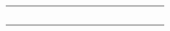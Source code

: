 \begin{landscape}
\begin{table}[]
{\begin{tabular}{@{}ccccllllllllllll@{}}
    \multicolumn{1}{l}{}                        & \multicolumn{1}{l}{}         & \multicolumn{1}{l}{}          & \multicolumn{1}{l}{}                            &                                          &                                            &                                   &                                  &                                               &                                                 &                         &          &                              &                         &          &                              \\
    \multicolumn{1}{l}{}                        & \multicolumn{1}{l}{}         & \multicolumn{1}{l}{}          & \multicolumn{1}{l}{}                            &                                          &                                            &                                   &                                  &                                               &                                                 &                         &          &                              &                         &          &                              \\
    \multicolumn{1}{l}{}                        & \multicolumn{1}{l}{}         & \multicolumn{1}{l}{}          & \multicolumn{1}{l}{}                            &                                          &                                            &                                   &                                  &                                               &                                                 &                         &          &                              &                         &          &                              \\
    \multicolumn{1}{l}{}                        & \multicolumn{1}{l}{}         & \multicolumn{1}{l}{}          & \multicolumn{1}{l}{}                            &                                          &                                            &                                   &                                  &                                               &                                                 &                         &          &                              &                         &          &                              \\
    \multicolumn{1}{l}{}                        & \multicolumn{1}{l}{}         & \multicolumn{1}{l}{}          & \multicolumn{1}{l}{}                            &                                          &                                            &                                   &                                  &                                               &                                                 &                         &          &                              &                         &          &                              \\

\end{tabular}}
\end{table}
\end{landscape}
